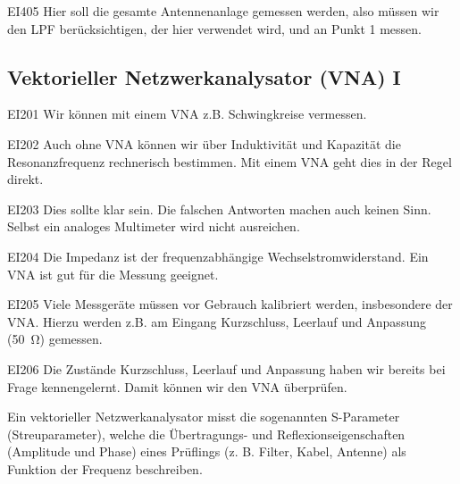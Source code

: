 \begin{sol}{EI405}
Hier soll die gesamte Antennenanlage gemessen werden, also müssen wir den LPF berücksichtigen, der hier verwendet wird, und an Punkt 1 messen.
\end{sol}

\begin{ohmchapter}
\end{ohmchapter}

\subsection{Vektorieller Netzwerkanalysator (VNA) I }

\begin{sol}{EI201}
    Wir können mit einem VNA z.B. Schwingkreise vermessen.
\end{sol}

\begin{sol}{EI202}
    Auch ohne VNA können wir über Induktivität und Kapazität die Resonanzfrequenz rechnerisch bestimmen. Mit einem VNA geht dies in der Regel direkt.
\end{sol}

\begin{sol}{EI203}
 Dies sollte klar sein. Die falschen Antworten machen auch keinen Sinn. Selbst ein analoges Multimeter wird nicht ausreichen.
\end{sol}

\begin{sol}{EI204}
Die Impedanz ist der frequenzabhängige Wechselstromwiderstand. Ein VNA ist gut für die Messung geeignet.
\end{sol}

\begin{sol}{EI205}
Viele Messgeräte müssen vor Gebrauch kalibriert werden, insbesondere der VNA. 
Hierzu werden z.B. am Eingang Kurzschluss, Leerlauf und Anpassung (\SI{50}{\ohm}) gemessen.
\end{sol}

\begin{sol}{EI206}
    Die Zustände Kurzschluss, Leerlauf und Anpassung haben wir bereits bei Frage  kennengelernt. Damit können wir den VNA überprüfen.
\end{sol}

\begin{ohmchapter}
    Ein vektorieller Netzwerkanalysator misst die sogenannten S-Parameter (Streuparameter), welche die Übertragungs- und Reflexionseigenschaften (Amplitude und Phase) eines Prüflings (z. B. Filter, Kabel, Antenne) als Funktion der Frequenz beschreiben.
\end{ohmchapter}


